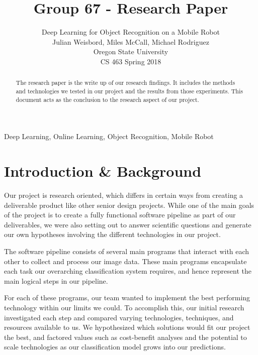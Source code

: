 \documentclass[journal]{IEEEtran}
\begin{document}
\title{Group 67 - Research Paper}
\author{Deep Learning for Object Recognition on a Mobile Robot\\
Julian Weisbord, Miles McCall, Michael Rodriguez \\
Oregon State University \\
CS 463 Spring 2018 \\
}
\maketitle

\begin{abstract}
	The research paper is the write up of our research findings. It includes the methods and technologies we tested in our project and the results from those experiments. This document acts as the conclusion to the research aspect of our project.
\end{abstract}

\begin{IEEEkeywords}
	Deep Learning, Online Learning, Object Recognition, Mobile Robot
\end{IEEEkeywords}

\tableofcontents

\listoffigures

\section{Introduction \& Background}
	Our project is research oriented, which differs in certain ways from creating a deliverable product like other senior design projects. While one of the main goals of the project is to create a fully functional software pipeline as part of our deliverables, we were also setting out to answer scientific questions and generate our own hypotheses involving the different technologies in our project. 
	
	The software pipeline consists of several main programs that interact with each other to collect and process our image data. These main programs encapsulate each task our overarching classification system requires, and hence represent the main logical steps in our pipeline. 
	
	For each of these programs, our team wanted to implement the best performing technology within our limits we could. To accomplish this, our initial research investigated each step and compared varying technologies, techniques, and resources available to us. We hypothesized which solutions would fit our project the best, and factored values such as cost-benefit analyses and the potential to scale technologies as our classification model grows into our predictions. 
	
\end{document}
